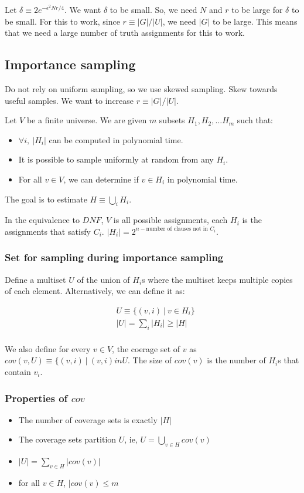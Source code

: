 Let $\delta \equiv 2e^{-\epsilon^2 Nr / 4}$. We want $\delta$ to be small.
So, we need $N$ and $r$ to be large for $\delta$ to be small. For this
to work, since $r \equiv |G|/|U|$, we need $|G|$ to be large. This means
that we need a large number of truth assignments for this to work.

\subsection{Importance sampling}
Do not rely on uniform sampling, so we use skewed sampling. Skew
towards useful samples. We want to increase $r \equiv |G|/|U|$.

Let $V$ be a finite universe. We are given $m$ subsets
$H_1, H_2, \dots H_m$ such that:

\begin{itemize}
\item $\forall i,~|H_i|$ can be computed in polynomial time.
\item It is possible to sample uniformly at random from any $H_i$.
\item For all $v \in V$, we can determine if $v \in H_i$ in polynomial time.
\end{itemize}

The goal is to estimate $H \equiv \bigcup_i H_i$.

In the equivalence to $DNF$, $V$ is all possible assignments,
each $H_i$ is the assignments that satisfy $C_i$. $|H_i| = 2^{n - \text{number of clauses not in $C_i$}}$.

\subsubsection{Set for sampling during importance sampling}

Define a multiset $U$ of the union of $H_i$s where the multiset keeps
multiple copies of each element. Alternatively, we can define it as:

\begin{align*}
  &U \equiv \{ (v, i)~\vert~v \in H_i \} \\
  &|U| = \sum_i |H_i| \geq |H| \\
\end{align*}

We also define for every $v \in V$, the coerage set of $v$ as $cov(v, U) \equiv \{ (v, i)~\vert~(v, i) in U$.
The size of $cov(v)$ is the number of $H_i$s that contain $v_i$.

\subsubsection{Properties of $cov$}
\begin{itemize}
\item The number of coverage sets is exactly $|H|$
\item The coverage sets partition $U$, ie, $U = \bigcup_{v \in H} cov(v)$
\item $|U| = \sum_{v \in H} |cov(v)|$
\item for all $v \in H$, $|cov(v) \leq m$ 
\end{itemize}


